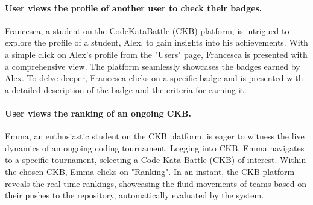 \paragraph*{User views the profile of another user to check their badges.}
Francesca, a student on the CodeKataBattle (CKB) platform, is intrigued to explore the profile of a student, Alex, to gain insights into his achievements. 
With a simple click on Alex's profile from the "Users" page, Francesca is presented with a comprehensive view. 
The platform seamlessly showcases the badges earned by Alex. 
To delve deeper, Francesca clicks on a specific badge and is presented with a detailed description of the badge and the criteria for earning it.

\paragraph*{User views the ranking of an ongoing CKB.}
Emma, an enthusiastic student on the CKB platform, is eager to witness the live dynamics of an ongoing coding tournament.
Logging into CKB, Emma navigates to a specific tournament, selecting a Code Kata Battle (CKB) of interest.
Within the chosen CKB, Emma clicks on "Ranking". In an instant, the CKB platform reveals the real-time rankings, showcasing the fluid movements of teams based on their pushes to the repository, automatically evaluated by the system.


